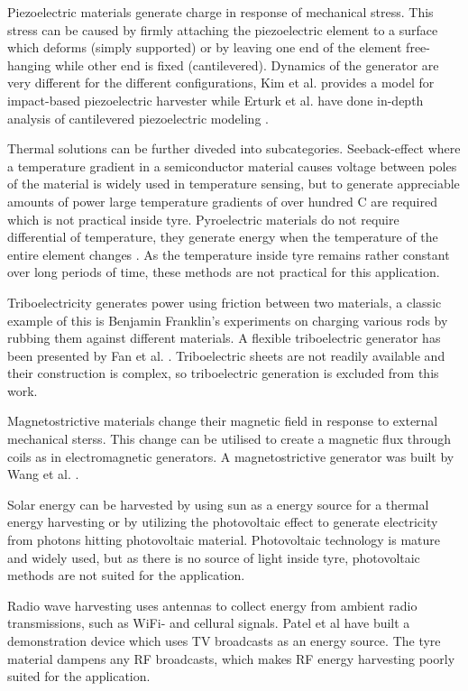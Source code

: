 Piezoelectric materials generate charge in response of mechanical stress. This stress can be caused by firmly attaching the piezoelectric element to a surface which deforms (simply supported) or by leaving one end of the element free-hanging while other end is fixed (cantilevered). Dynamics of the generator are very different for the different configurations, Kim et al. \cite{Kim2014a} provides a model for impact-based piezoelectric harvester while Erturk et al. have done in-depth analysis of cantilevered piezoelectric modeling \cite{Erturk2009}. 

Thermal solutions can be further diveded into subcategories. Seeback-effect where a temperature gradient in a semiconductor material causes voltage between poles of the material is widely used in temperature sensing, but to generate appreciable amounts of power large temperature gradients of over hundred \degree C are required \cite{Amatya2010} which is not practical inside tyre. Pyroelectric materials do not require differential of temperature, they generate energy when the temperature of the entire element changes \cite{Zhang2011}. As the temperature inside tyre remains rather constant over long periods of time, these methods are not practical for this application.

Triboelectricity generates power using friction between two materials, a classic example of this is Benjamin Franklin's experiments on charging various rods by rubbing them against different materials. A flexible triboelectric generator has been presented by Fan et al. \cite{Fan2012}. Triboelectric sheets are not readily available and their construction is complex, so triboelectric generation is excluded from this work. 

Magnetostrictive materials change their magnetic field in response to external mechanical sterss. This change can be utilised to create a magnetic flux through coils as in electromagnetic generators. A magnetostrictive generator was built by Wang et al. \cite{Wang2006}. 

Solar energy can be harvested by using sun as a energy source for a thermal energy harvesting or by utilizing the photovoltaic effect to generate electricity from photons hitting photovoltaic material. Photovoltaic technology is mature and widely used, but as there is no source of light inside tyre, photovoltaic methods are not suited for the application.

Radio wave harvesting uses antennas to collect energy from ambient radio transmissions, such as WiFi- and cellural signals. Patel et al \cite{Patel2014} have built a demonstration device which uses TV broadcasts as an energy source. The tyre material dampens any RF broadcasts, which makes RF energy harvesting poorly suited for the application.

